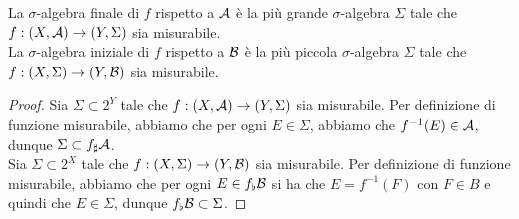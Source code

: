\documentclass{article}
\renewcommand\A{\mc{A}}
\begin{document}
\begin{remark}{}{}
    La $\sigma$-algebra finale di $f$ rispetto a $\A$ è la più grande $\sigma$-algebra $\Sigma$ tale che $f : (X,\A)\to (Y,\Sigma)$ sia misurabile.\\
    La $\sigma$-algebra iniziale di $f$ rispetto a $\mathcal{B}$ è la più piccola $\sigma$-algebra $\Sigma$ tale che $f : (X,\Sigma)\to (Y,\mathcal{B})$ sia misurabile.
    \begin{proof}
        Sia $\Sigma \subset 2^Y$ tale che $f : (X,\A)\to (Y,\Sigma)$ sia misurabile. Per definizione di funzione misurabile, abbiamo che per ogni $E \in \Sigma$, abbiamo che $f^{-1}(E)\in \A$, dunque $\Sigma\subset f_\sharp\A$.\\
        Sia $\Sigma \subset 2^X$ tale che $f : (X,\Sigma)\to (Y,\mathcal{B})$ sia misurabile. Per definizione di funzione misurabile, abbiamo che per ogni $E \in f_\flat\mathcal{B}$ si ha che $E = f^{-1}(F)$ con $F \in B$ e quindi che $E \in \Sigma$, dunque $f_\flat\mathcal{B}\subset \Sigma$.
    \end{proof}
\end{remark}
\end{document}
